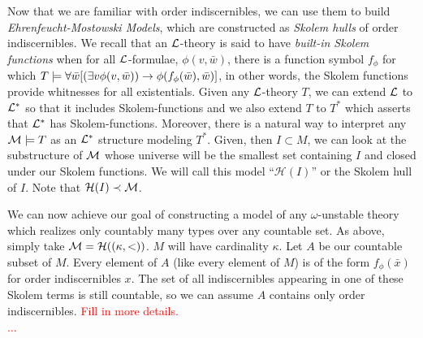 Now that we are familiar with order indiscernibles, we can use them to build \textit{Ehrenfeucht-Mostowski Models}, which are constructed as \textit{Skolem hulls} of order indiscernibles. 
We recall that an \(\mathcal{L}\)-theory is said to have \textit{built-in Skolem functions} when for all \(\mathcal{L}\)-formulae, \(\phi(v, \bar{w})\), there is a function symbol \(f_\phi\) for which 
\(T \models \forall \bar{w} [(\exists v \phi(v, \bar{w})) \to \phi(f_\phi(\bar{w}), \bar{w})]\), in other words, the Skolem functions provide whitnesses for all existentials. 
Given any \(\mathcal{L}\)-theory \(T\), we can extend \(\mathcal{L}\) to \(\mathcal{L}^*\) so that it includes Skolem-functions and we also extend \(T\) to \(T^*\) which asserts that \(\mathcal{L}^*\) has Skolem-functions. 
Moreover, there is a natural way to interpret any \(\mathcal{M} \models T\) as an \(\mathcal{L}^*\) structure modeling \(T^*\).
Given, then \(I \subset M\), we can look at the substructure of \(\mathcal{M}\) whose universe will be the smallest set containing \(I\) and closed under our Skolem functions. 
We will call this model ``\(\mathcal{H}(I)\)'' or the Skolem hull of \(I\).
Note that \(\mathcal{H}(I) \prec \mathcal{M}\).

We can now achieve our goal of constructing a model of any \(\omega\)-unstable theory which realizes only countably many types over any countable set. 
As above, simply take \(\mathcal{M} = \mathcal{H}((\kappa, <))\). \(M\) will have cardinality \(\kappa\).
Let \(A\) be our countable subset of \(M\). 
Every element of \(A\) (like every element of \(M\)) is of the form \(f_\phi(\bar{x})\) for order indiscernibles \(x\).  
The set of all indiscernibles appearing in one of these Skolem terms is still countable, so we can assume \(A\) contains only order indiscernibles.
\textcolor{red}{Fill in more details.}

\textcolor{red}{\(\ldots\)}
